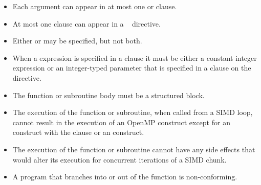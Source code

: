 \restrictions
\begin{itemize}
\item Each argument can appear in at most one  or  clause.

\item At most one  clause can appear in a ~ directive.

\item Either  or  may be specified, but not both.

\item When a  expression is specified in a  clause it must be
either a constant integer expression or an integer-typed parameter that is specified in
a  clause on the directive.

\item The function or subroutine body must be a structured block.

\item The execution of the function or subroutine, when called from a SIMD loop, cannot result in the execution of an OpenMP construct except for an  construct with the  clause or an  construct.

\item The execution of the function or subroutine cannot have any side effects that would
alter its execution for concurrent iterations of a SIMD chunk.

\item A program that branches into or out of the function is non-conforming.




\end{itemize}
